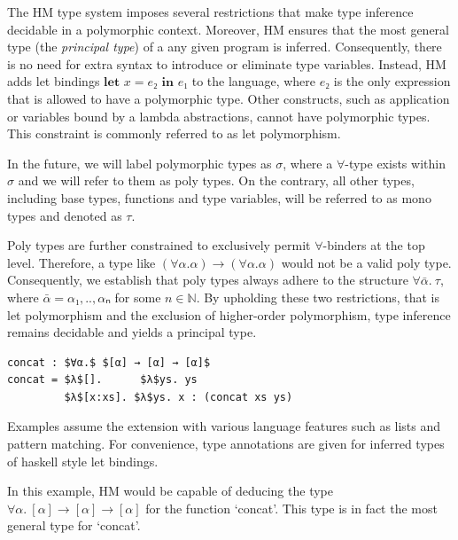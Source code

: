 \documentclass[runningheads]{llncs}
\newcommand{\kwlet}{\textbf{let }}
\newcommand{\kwin}{\textbf{ in }}
\begin{document}
The HM type system imposes several restrictions that make type
inference decidable in a polymorphic context. Moreover, HM ensures that the
most general type (the \emph{principal type}) of a any given program is
inferred.
Consequently, there is no need for extra syntax to introduce or eliminate type
variables.
Instead, HM adds let bindings $\kwlet x = e₂ \kwin e₁$ to the language, where
$e₂$ is the only expression that is allowed to have a polymorphic type.
Other constructs, such as application or variables bound by a lambda
abstractions, cannot have polymorphic types.
This constraint is commonly referred to as let polymorphism.

In the future, we will label polymorphic types as $σ$,
where a $∀$-type exists within $σ$ and we will refer to them as poly types.
On the contrary, all other types, including base
types, functions and type variables, will be referred to as mono types and
denoted as $τ$.

Poly types are further constrained to exclusively permit $∀$-binders at the top
level.
Therefore, a type like $(∀α. α) → (∀α. α)$ would not be a valid poly type.
Consequently, we establish that poly types always adhere to the structure
$∀\bar{α}. \ τ$, where $\bar{α} = α₁,..,αₙ$ for some $n ∈ ℕ$.
By upholding these two restrictions, that is let polymorphism and the exclusion
of
higher-order polymorphism, type inference remains decidable and
yields a principal type.
\begin{example}
  \begin{lstlisting}
concat : $∀α.$ $[α] → [α] → [α]$
concat = $λ$[].      $λ$ys. ys           
         $λ$[x:xs]. $λ$ys. x : (concat xs ys)   
  \end{lstlisting}
\end{example}
Examples assume the extension with various language features such as
lists and pattern matching.
For convenience, type annotations are given for inferred types of haskell style
let bindings.

In this example, HM would be capable of deducing the type $∀α.\ [α] → [α] →
  [α]$
for the function `concat'.
This type is in fact the most general type for `concat'.
\end{document}
